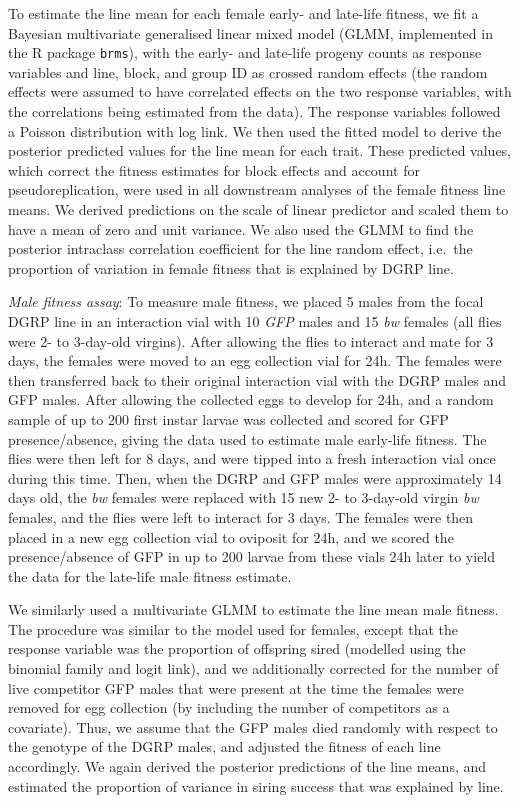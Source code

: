 \documentclass{article}
\begin{document}
To estimate the line mean for each female early- and late-life fitness,
we fit a Bayesian multivariate generalised linear mixed model (GLMM,
implemented in the R package \texttt{brms}), with the early- and
late-life progeny counts as response variables and line, block, and
group ID as crossed random effects (the random effects were assumed to
have correlated effects on the two response variables, with the
correlations being estimated from the data). The response variables
followed a Poisson distribution with log link. We then used the fitted
model to derive the posterior predicted values for the line mean for
each trait. These predicted values, which correct the fitness estimates
for block effects and account for pseudoreplication, were used in all
downstream analyses of the female fitness line means. We derived
predictions on the scale of linear predictor and scaled them to have a
mean of zero and unit variance. We also used the GLMM to find the
posterior intraclass correlation coefficient for the line random effect,
i.e.~the proportion of variation in female fitness that is explained by
DGRP line.

\emph{Male fitness assay}: To measure male fitness, we placed 5 males
from the focal DGRP line in an interaction vial with 10 \emph{GFP} males
and 15 \emph{bw} females (all flies were 2- to 3-day-old virgins). After
allowing the flies to interact and mate for 3 days, the females were
moved to an egg collection vial for 24h. The females were then
transferred back to their original interaction vial with the DGRP males
and GFP males. After allowing the collected eggs to develop for 24h, and
a random sample of up to 200 first instar larvae was collected and
scored for GFP presence/absence, giving the data used to estimate male
early-life fitness. The flies were then left for 8 days, and were tipped
into a fresh interaction vial once during this time. Then, when the DGRP
and GFP males were approximately 14 days old, the \emph{bw} females were
replaced with 15 new 2- to 3-day-old virgin \emph{bw} females, and the
flies were left to interact for 3 days. The females were then placed in
a new egg collection vial to oviposit for 24h, and we scored the
presence/absence of GFP in up to 200 larvae from these vials 24h later
to yield the data for the late-life male fitness estimate.

We similarly used a multivariate GLMM to estimate the line mean male
fitness. The procedure was similar to the model used for females, except
that the response variable was the proportion of offspring sired
(modelled using the binomial family and logit link), and we additionally
corrected for the number of live competitor GFP males that were present
at the time the females were removed for egg collection (by including
the number of competitors as a covariate). Thus, we assume that the GFP
males died randomly with respect to the genotype of the DGRP males, and
adjusted the fitness of each line accordingly. We again derived the
posterior predictions of the line means, and estimated the proportion of
variance in siring success that was explained by line.
\end{document}
